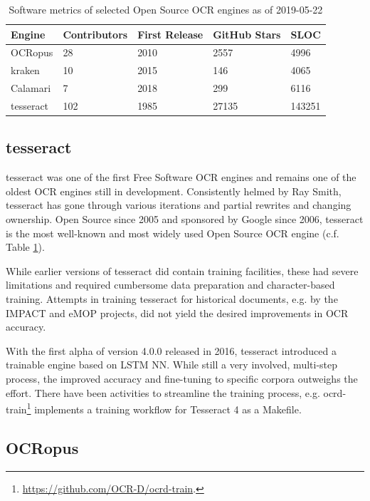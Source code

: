 \documentclass[conference]{IEEEtran}
\begin{document}
\begin{table}[b]
\begin{tabular}{lllll}
\hline
Engine    & Contributors & First Release & GitHub Stars & SLOC \\ \hline
OCRopus   & 28           & 2010          & 2557         & 4996 \\
kraken    & 10           & 2015          & 146          & 4065 \\
Calamari  & 7            & 2018          & 299          & 6116 \\
tesseract & 102          & 1985          & 27135        & 143251 \\

\end{tabular}
\caption{Software metrics of selected Open Source OCR engines as of 2019-05-22}
\label{tab:stats}
\end{table}

\subsection{tesseract}

tesseract \cite{4376991} was one of the first Free Software OCR
engines \cite{Rice1995TheFA} and remains one of the oldest OCR engines still in
development. Consistently helmed by Ray Smith, tesseract has gone
through various iterations and partial rewrites and changing
ownership. Open Source since 2005 and sponsored by Google since
2006, tesseract is the most well-known and most widely used Open
Source OCR engine (c.f. Table \ref{tab:stats}).

While earlier versions of tesseract did contain training facilities, 
these had severe limitations and required cumbersome data preparation and
character-based training. Attempts in training tesseract for historical documents, e.g.
by the IMPACT \cite{PSNC} and eMOP \cite{doi:10.1093/llc/fqv062} projects, did not yield 
the desired improvements in OCR accuracy.

With the first alpha of version 4.0.0 released in 2016, tesseract introduced a trainable
engine based on LSTM NN.\cite{smith2016tesseract} While still a very involved, multi-step process, the
improved accuracy and fine-tuning to specific corpora outweighs the effort.
There have been activities to streamline the training process, e.g.
ocrd-train\footnote{\url{https://github.com/OCR-D/ocrd-train}.} implements a training workflow for
Tesseract 4 as a Makefile.

\subsection{OCRopus}
\end{document}
